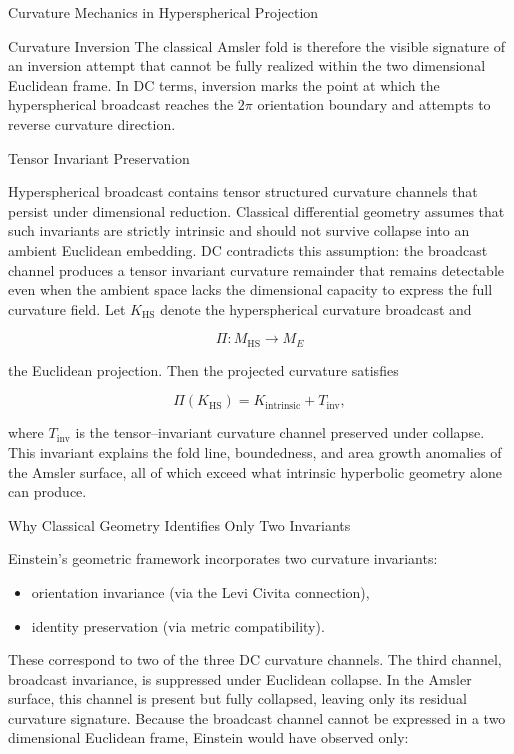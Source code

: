 \documentclass[final,onefignum,onetabnum]{siamart}
\begin{document}
\begin{section}{Curvature Mechanics in Hyperspherical Projection}
\begin{subsection}{Curvature Inversion}
The classical Amsler fold is therefore the visible signature of an inversion attempt that cannot be fully realized within the two dimensional Euclidean frame. In DC terms, inversion marks the point at which the hyperspherical broadcast reaches the $2\pi$ orientation boundary and attempts to reverse curvature direction.
\end{subsection}

\begin{subsection}{Tensor Invariant Preservation}

Hyperspherical broadcast contains tensor structured curvature channels that persist under dimensional reduction. Classical differential geometry assumes that such invariants are strictly intrinsic and should not survive collapse into an ambient Euclidean embedding. DC contradicts this assumption: the broadcast channel produces a tensor invariant curvature remainder that remains detectable even when the ambient space lacks the dimensional capacity to express the full curvature field. Let $K_{\mathrm{HS}}$ denote the hyperspherical curvature broadcast and


\[
\Pi : M_{\mathrm{HS}} \longrightarrow M_{E}
\]


the Euclidean projection. Then the projected curvature satisfies


\[
\Pi\!\left( K_{\mathrm{HS}} \right) = K_{\mathrm{intrinsic}} + T_{\mathrm{inv}},
\]


where $T_{\mathrm{inv}}$ is the tensor--invariant curvature channel preserved under collapse. This invariant explains the fold line, boundedness, and area growth anomalies of the Amsler surface, all of which exceed what intrinsic hyperbolic geometry alone can produce.
\end{subsection}

\begin{subsection}{Why Classical Geometry Identifies Only Two Invariants}

Einstein’s geometric framework incorporates two curvature invariants:

\begin{itemize}
    \item orientation invariance (via the Levi Civita connection),
    \item identity preservation (via metric compatibility).
    \end{itemize}
    
These correspond to two of the three DC curvature channels. The third channel, broadcast invariance, is suppressed under Euclidean collapse. In the Amsler surface, this channel is present but fully collapsed, leaving only its residual curvature signature. Because the broadcast channel cannot be expressed in a two dimensional Euclidean frame, Einstein would have observed only:


\end{subsection}
\end{section}
\end{document}
